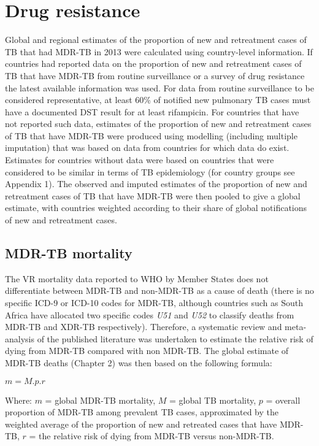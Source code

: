 \section{Drug resistance}

Global and regional estimates of the proportion of new and retreatment cases of TB that had MDR-TB in 2013 were calculated using country-level information. If countries had reported data on the proportion of new and retreatment cases of TB that have MDR-TB from routine surveillance or a survey of drug resistance the latest available information was used. For data from routine surveillance to be considered representative, at least 60\% of notified new pulmonary TB cases must have a documented DST result for at least rifampicin. For countries that have not reported such data, estimates of the proportion of new and retreatment cases of TB that have MDR-TB were produced using modelling (including multiple imputation) that was based on data from countries for which data do exist. Estimates for countries without data were based on countries that were considered to be similar in terms of TB epidemiology (for country groups see Appendix 1). The observed and imputed estimates of the proportion of new and retreatment cases of TB that have MDR-TB were then pooled to give a global estimate, with countries weighted according to their share of global notifications of new and retreatment cases.

\subsection{MDR-TB mortality}

The VR mortality data reported to WHO by Member States does not differentiate between MDR-TB and non-MDR-TB as a cause of death (there is no specific ICD-9 or ICD-10 codes for MDR-TB, although countries such as South Africa have allocated two specific codes \textit{U51} and \textit{U52} to classify deaths from MDR-TB and XDR-TB respectively). Therefore, a systematic review and meta-analysis of the published literature was undertaken to estimate the relative risk of dying from MDR-TB compared with non MDR-TB. The global estimate of MDR-TB deaths (Chapter 2) was then based on the following formula: 

$m = M.p.r$ 

Where:
$m$ = global MDR-TB mortality,
$M$ = global TB mortality,
$p$ = overall proportion of MDR-TB among prevalent TB cases, approximated by the weighted average of the proportion of new and retreated cases that have MDR-TB,
$r$ = the relative risk of dying from MDR-TB versus non-MDR-TB.

